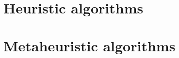 \label{sec:os}



\section{Heuristic algorithms}
\label{sec:heuristic}


\section{Metaheuristic algorithms}
\label{sec:meta}


